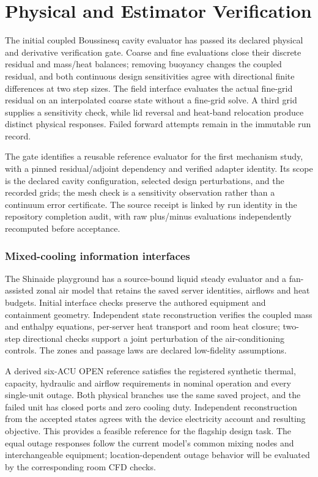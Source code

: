 \section{Physical and Estimator Verification}
The initial coupled Boussinesq cavity evaluator has passed its declared physical and derivative verification gate. Coarse and fine evaluations close their discrete residual and mass/heat balances; removing buoyancy changes the coupled residual, and both continuous design sensitivities agree with directional finite differences at two step sizes. The field interface evaluates the actual fine-grid residual on an interpolated coarse state without a fine-grid solve. A third grid supplies a sensitivity check, while lid reversal and heat-band relocation produce distinct physical responses. Failed forward attempts remain in the immutable run record.

The gate identifies a reusable reference evaluator for the first mechanism study, with a pinned residual/adjoint dependency and verified adapter identity. Its scope is the declared cavity configuration, selected design perturbations, and the recorded grids; the mesh check is a sensitivity observation rather than a continuum error certificate. The source receipt is linked by run identity in the repository completion audit, with raw plus/minus evaluations independently recomputed before acceptance.
\subsubsection{Mixed-cooling information interfaces}
The Shinaide playground has a source-bound liquid steady evaluator and a fan-assisted zonal air model that retains the saved server identities, airflows and heat budgets. Initial interface checks preserve the authored equipment and containment geometry. Independent state reconstruction verifies the coupled mass and enthalpy equations, per-server heat transport and room heat closure; two-step directional checks support a joint perturbation of the air-conditioning controls. The zones and passage laws are declared low-fidelity assumptions.

A derived six-ACU OPEN reference satisfies the registered synthetic thermal, capacity, hydraulic and airflow requirements in nominal operation and every single-unit outage. Both physical branches use the same saved project, and the failed unit has closed ports and zero cooling duty. Independent reconstruction from the accepted states agrees with the device electricity account and resulting objective. This provides a feasible reference for the flagship design task. The equal outage responses follow the current model's common mixing nodes and interchangeable equipment; location-dependent outage behavior will be evaluated by the corresponding room CFD checks.

